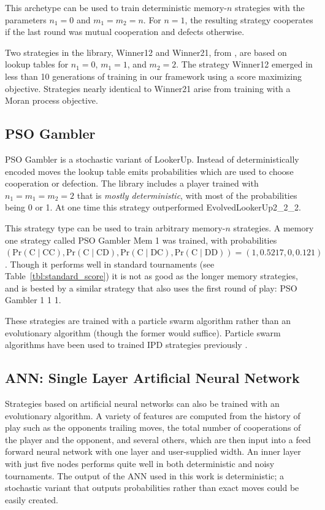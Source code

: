\documentclass{article}
\begin{document}
This archetype can be used to train deterministic memory-$n$ strategies with the
parameters $n_1=0$ and $m_1=m_2=n$. For $n=1$, the resulting strategy cooperates
if the last round was mutual cooperation and defects otherwise.

Two strategies in the library, Winner12 and Winner21, from \cite{Mathieu2015},
are based on lookup tables for $n_1 = 0$, $m_1 = 1$, and $m_2=2$. The strategy
Winner12 emerged in less than 10 generations of training in our framework using
a score maximizing objective. Strategies nearly identical to Winner21 arise
from training with a Moran process objective.

\subsection{PSO Gambler}

PSO Gambler is a stochastic variant of LookerUp. Instead of deterministically
encoded moves the lookup table emits probabilities which are
used to choose cooperation or defection. The library includes a player trained
with $n_1 = m_1 = m_2 = 2$ that is \emph{mostly deterministic}, with most of the
probabilities being 0 or 1. At one time this strategy outperformed
EvolvedLookerUp2\_2\_2.

This strategy type can be used to train arbitrary memory-$n$ strategies. A
memory one strategy called PSO Gambler Mem 1 was trained, with
probabilities $(\text{Pr}(\text{C}\;|\;\text{CC}),
                \text{Pr}(\text{C}\;|\;\text{CD}),
                \text{Pr}(\text{C}\;|\;\text{DC}),
                \text{Pr}(\text{C}\;|\;\text{DD})) = (1, 0.5217, 0, 0.121)$.
Though it performs well in standard tournaments (see
Table~\ref{tbl:standard_score})
it is not as good as the longer memory strategies, and is bested by a similar
strategy that also uses the first round of play: PSO Gambler 1 1 1.

These strategies are trained with a particle swarm algorithm rather than an
evolutionary algorithm (though the former would suffice). Particle swarm
algorithms have been used to trained IPD strategies previously
\cite{franken2005particle}.

\subsection{ANN: Single Layer Artificial Neural Network}

Strategies based on artificial neural networks can also be trained with an
evolutionary algorithm. A variety of features are computed from the history
of play such as the opponents trailing moves, the total number of cooperations
of the player and the opponent, and several others, which are then input
into a feed forward neural network with one layer and user-supplied width.
An inner layer with just five nodes performs quite well in both deterministic and
noisy tournaments. The output of the ANN used in this work is deterministic;
a stochastic variant that outputs probabilities rather than exact moves could
be easily created.
\end{document}

